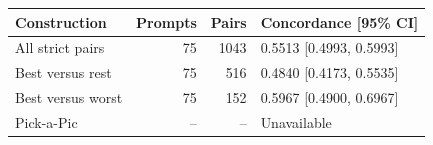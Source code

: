 \begin{tabular}{lrrl}
\toprule
Construction & Prompts & Pairs & Concordance [95\% CI] \\
\midrule
All strict pairs & 75 & 1043 & 0.5513 [0.4993, 0.5993] \\
Best versus rest & 75 & 516 & 0.4840 [0.4173, 0.5535] \\
Best versus worst & 75 & 152 & 0.5967 [0.4900, 0.6967] \\
Pick-a-Pic & -- & -- & Unavailable \\
\bottomrule
\end{tabular}
